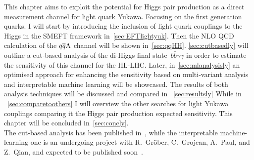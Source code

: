 This chapter aims to exploit the potential for Higgs pair production as a direct measurement channel for light quark Yukawa. Focusing on the first generation quarks.  I will start by introducing the inclusion of light quark couplings to the Higgs in the SMEFT framework in~\autoref{sec:EFTlightyuk}. Then the NLO QCD calculation of the $q\overline q \rm A$ channel will be shown in~\autoref{sec:qqHH}. \autoref{sec:cutbasedly} will outline a cut-based analysis of the di-Higgs final state~$ b \bar b \gamma \gamma$ in order to estimate the sensitivity of this channel for the HL-LHC. Later, in~\autoref{sec:mlanalysisly} an optimised approach for enhancing the sensitivity based on multi-variant analysis and interpretable machine learning will be showcased. The results of both analysis techniques will be discussed and compared in ~\autoref{sec:resultsly} While in ~\autoref{sec:comparetoothers} I will overview  the other searches for light Yukawa couplings comparing it the Higgs pair production expected sensitivity. This chapter will be concluded in~\autoref{sec:concly}. \\ The cut-based analysis has been published in~\cite{Alasfar:2019pmn}, while the interpretable machine-learning one is an undergoing project with R.~Gr\"ober, C.~Grojean, A.~Paul, and Z.~Qian, and expected to be published soon~\cite{IML}. 
